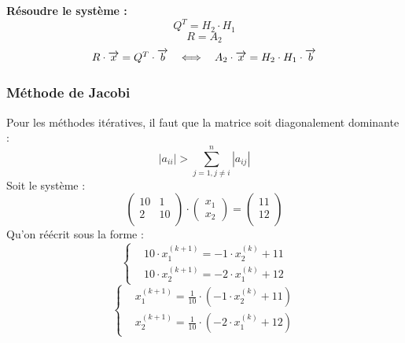 \textbf{Résoudre le système :}
\begin{equation}
    Q^T = H_2\cdot H_1
    \nonumber
\end{equation}
\begin{equation}
    R = A_2
    \nonumber
\end{equation}
\begin{equation}
    \begin{tabular}{ccc}
        $R\cdot \overrightarrow{x}=Q^T\cdot \overrightarrow{b}$
         & $\Longleftrightarrow $
         & $A_2\cdot \overrightarrow{x}=H_2\cdot H_1\cdot \overrightarrow{b}$
    \end{tabular}
    \nonumber
\end{equation}
\subsubsection*{Méthode de Jacobi}
\noindent
Pour les méthodes itératives, il faut que la matrice soit diagonalement dominante :
\begin{equation}
    \left | a_{ii} \right | > \sum_{j=1,j\neq i}^{n} \left | a_{ij} \right |
    \nonumber
\end{equation}
Soit le système :
\begin{equation}
    \begin{pmatrix}
        10 & 1  \\
        2  & 10 \\
    \end{pmatrix}
    \cdot
    \begin{pmatrix}
        x_1 \\
        x_2
    \end{pmatrix}
    =
    \begin{pmatrix}
        11 \\
        12 \\
    \end{pmatrix}
    \nonumber
\end{equation}
Qu'on réécrit sous la forme :
\begin{equation}
    \left\{\begin{aligned}
         & 10\cdot x_1^{(k+1)}=-1\cdot x_2^{(k)}+11 \\
         & 10\cdot x_2^{(k+1)}=-2\cdot x_1^{(k)}+12
    \end{aligned}\right.
    \nonumber
\end{equation}
\begin{equation}
    \left\{\begin{aligned}
         & x_1^{(k+1)}=\frac{1}{10}\cdot(-1\cdot x_2^{(k)}+11) \\
         & x_2^{(k+1)}=\frac{1}{10}\cdot(-2\cdot x_1^{(k)}+12)
    \end{aligned}\right.
    \nonumber
\end{equation}
